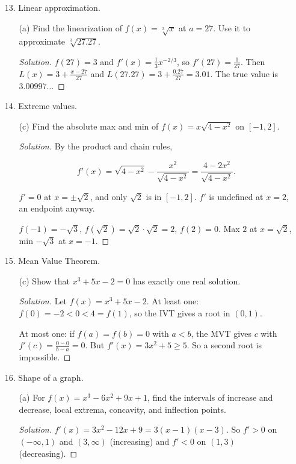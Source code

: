 \documentclass[12pt]{article}
\newenvironment{solution}
  {\renewcommand\qedsymbol{$\blacksquare$}\begin{proof}[Solution]}
  {\end{proof}}
\begin{document}
\begin{enumerate}
\begin{enumerate}
\begin{solution}
\[V = \frac13\pi r^2 h = \frac{\pi h^3}{12}, \qquad \frac{dV}{dt} = \frac{\pi h^2}{4}\frac{dh}{dt}.\]

At $h=4$: $4 = 4\pi \frac{dh}{dt}$, so $\frac{dh}{dt} = \frac{1}{\pi}$ m/min. The factor $\frac{\pi h^2}{4}$ is the area of the water surface, which is why the level rises more slowly as the tank fills.
\end{solution}
\end{enumerate}
\item[13.] Linear approximation.
\begin{enumerate}
\item[(a)] Find the linearization of $f(x) = \sqrt[3]{x}$ at $a=27$. Use it to approximate $\sqrt[3]{27.27}$.
\begin{solution}
$f(27) = 3$ and $f'(x) = \frac13 x^{-2/3}$, so $f'(27) = \frac{1}{27}$. Then $L(x) = 3 + \frac{x-27}{27}$ and $L(27.27) = 3 + \frac{0.27}{27} = 3.01$. The true value is $3.00997\ldots$
\end{solution}
\end{enumerate}
\item[14.] Extreme values.
\begin{enumerate}
\item[(c)] Find the absolute max and min of $f(x) = x\sqrt{4-x^2}$ on $[-1,2]$.
\begin{solution}
By the product and chain rules,

\[f'(x) = \sqrt{4-x^2} - \frac{x^2}{\sqrt{4-x^2}} = \frac{4 - 2x^2}{\sqrt{4-x^2}}.\]

$f' = 0$ at $x = \pm\sqrt2$, and only $\sqrt2$ is in $[-1,2]$. $f'$ is undefined at $x = 2$, an endpoint anyway.

$f(-1) = -\sqrt3$, $f(\sqrt2) = \sqrt2\cdot\sqrt2 = 2$, $f(2) = 0$. Max $2$ at $x = \sqrt2$, min $-\sqrt3$ at $x = -1$.
\end{solution}
\end{enumerate}
\item[15.] Mean Value Theorem.
\begin{enumerate}
\item[(c)] Show that $x^3 + 5x - 2 = 0$ has exactly one real solution.
\begin{solution}
Let $f(x) = x^3 + 5x - 2$. At least one: $f(0) = -2 < 0 < 4 = f(1)$, so the IVT gives a root in $(0,1)$.

At most one: if $f(a) = f(b) = 0$ with $a<b$, the MVT gives $c$ with $f'(c) = \frac{0-0}{b-a} = 0$. But $f'(x) = 3x^2 + 5 \ge 5$. So a second root is impossible.
\end{solution}
\end{enumerate}
\item[16.] Shape of a graph.
\begin{enumerate}
\item[(a)] For $f(x) = x^3 - 6x^2 + 9x + 1$, find the intervals of increase and decrease, local extrema, concavity, and inflection points.
\begin{solution}
$f'(x) = 3x^2 - 12x + 9 = 3(x-1)(x-3)$. So $f' > 0$ on $(-\infty,1)$ and $(3,\infty)$ (increasing) and $f'<0$ on $(1,3)$ (decreasing).


\end{solution}
\end{enumerate}
\end{enumerate}
\end{document}

